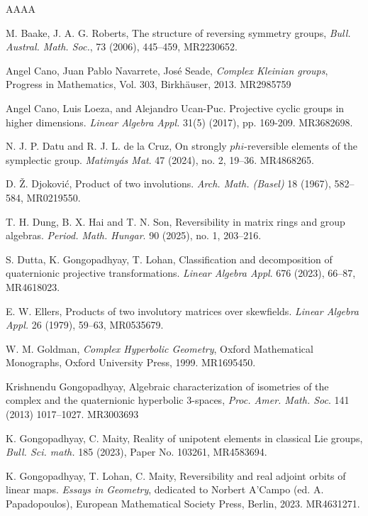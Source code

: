 \documentclass[11pt]{amsart}
\numberwithin{equation}{section}
\theoremstyle{plain}
\theoremstyle{definition}
\numberwithin{equation}{section}
\begin{document}
\begin{thebibliography}{AAAA}

 M. Baake, J. A. G. Roberts, The structure of reversing symmetry groups, {\it Bull. Austral. Math. Soc.},  73 (2006), 445--459, MR2230652. 


             Angel Cano,   Juan Pablo Navarrete,  Jos\'{e} Seade, {\it Complex {K}leinian groups},  Progress in Mathematics, Vol. 303, Birkh\"{a}user, 2013. MR2985759

             Angel Cano, Luis Loeza, and Alejandro Ucan-Puc. Projective cyclic groups in higher dimensions. {\it  Linear Algebra Appl.} 31(5) (2017), pp. 169-209. MR3682698.
            
	

 N. J. P. Datu and R. J. L. de la Cruz, {On strongly $phi$-reversible elements of the symplectic group}. 
{\it Matimyás Mat}. 47 (2024), no. 2, 19–36. MR4868265.

 D. Ž. Djoković,  Product of two involutions. \textit{Arch. Math. (Basel)} 18 (1967), 582--584, MR0219550.

T. H. Dung, B. X. Hai and T. N. Son, Reversibility in matrix rings and group algebras.
{\it Period. Math. Hungar}. 90 (2025), no. 1, 203–216.

  S. Dutta,  K.  Gongopadhyay,  T.  Lohan,  Classification and decomposition of quaternionic projective transformations. {\it Linear Algebra Appl}. 676 (2023), 66--87, MR4618023.


  E. W. Ellers, Products of two involutory matrices over skewfields. \textit{Linear Algebra Appl.} 26 (1979), 59--63, MR0535679.

W. M. Goldman,
\textit{Complex Hyperbolic Geometry},
Oxford Mathematical Monographs, Oxford University Press, 1999. MR1695450.
 
  Krishnendu Gongopadhyay, Algebraic characterization of isometries of the complex and the quaternionic hyperbolic 3-spaces, {\it Proc. Amer. Math. Soc}. 141 (2013) 1017–1027. MR3003693
 
 K. Gongopadhyay, C. Maity, { Reality of unipotent elements in classical Lie groups}, {\it Bull. Sci. math.} 185 (2023), Paper No.  103261, MR4583694.

	
	K.  Gongopadhyay,  T.  Lohan, C.  Maity,   Reversibility and real adjoint orbits of linear maps.  { \it Essays in Geometry}, dedicated to Norbert A'Campo (ed. A. Papadopoulos), European Mathematical Society Press, Berlin, 2023. MR4631271. 
		 

\end{thebibliography}
\end{document}

